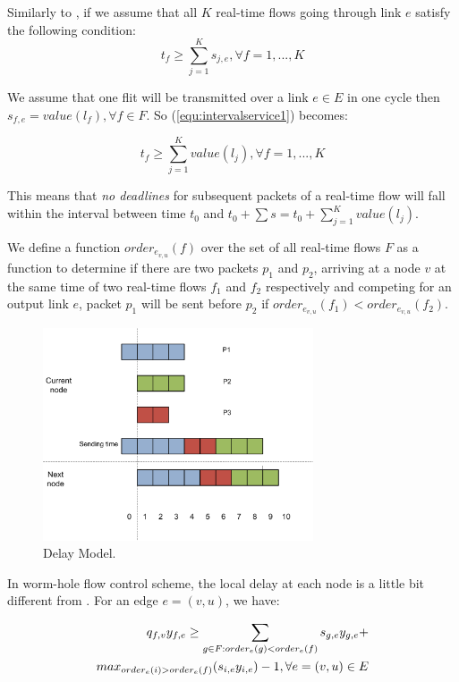 \documentclass[conference, twocolumn]{IEEEtran}
\theoremstyle{definition}
\begin{document}
Similarly to \cite{Ferrari90ascheme}, if we assume that all $K$ 
real-time flows going through link $e$ satisfy the following condition:
\begin{equation}\label{equ:intervalservice1}
t_f \geq \sum_{j=1}^Ks_{j,e}, \forall f = 1,...,K
\end{equation}

We assume that one flit will be transmitted over a link $e \in E$ in one cycle
then $s_{f,e}=value(l_f), \forall f \in F$. So (\ref{equ:intervalservice1})
becomes:

\begin{equation}\label{equ:intervalservice2}
t_f \geq \sum_{j=1}^Kvalue(l_j), \forall f = 1,...,K
\end{equation}

This means that {\em no deadlines} for subsequent packets of a real-time flow
will fall within the interval between time $t_0$ and $t_0 + \sum s = t_0 +
\sum_{j=1}^Kvalue(l_j)$.

We define a function $order_{e_{v,u}}(f)$ over the set of all real-time flows
$F$ as a function to determine if there are two packets $p_1$ and $p_2$, arriving at
a node $v$ at the same time of two real-time flows $f_1$ and $f_2$ respectively
and competing for an output link $e$, packet $p_1$ will be sent before $p_2$ if
$order_{e_{v,u}}(f_1) < order_{e_{v,u}}(f_2)$. 

\begin{figure}[htbp]
\centering
\includegraphics[width=8cm]{pics/DelayModel.png}
\caption[Delays for packets.]
{Delay Model.}\label{fig:DelayModel}
\end{figure}

In worm-hole flow control scheme, the local delay at each node is a little bit
different from \cite{Ferrari90ascheme}. For an edge $e = (v,u)$, we have:

\begin{eqnarray}\label{equ:queueDelay}
q_{f,v}y_{f,e} \geq \sum_{g \in F:order_{e}(g) <
order_{e}(f)}s_{g,e}y_{g,e} + \notag \\ 
max_{order_{e}(i)>order_{e}(f)}(s_{i,e}y_{i,e})-1, \forall e = (v,u)
\in E
\end{eqnarray}
\end{document}
